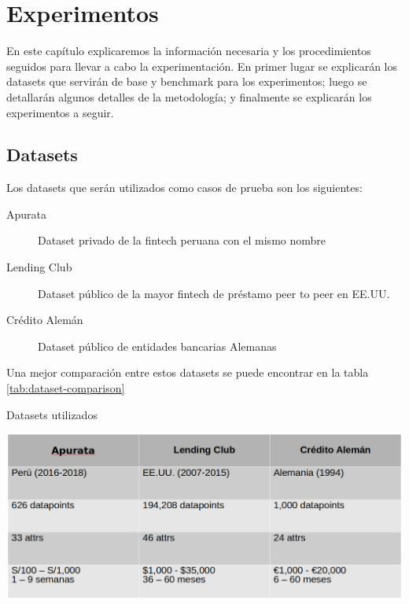 \chapter{Experimentos}


En este capítulo explicaremos la información necesaria y los procedimientos seguidos para llevar a cabo la experimentación. En primer lugar se explicarán los datasets que servirán de base y benchmark para los experimentos; luego se detallarán algunos detalles de la metodología; y finalmente se explicarán los experimentos a seguir.

\section{Datasets}

Los datasets que serán utilizados como casos de prueba son los siguientes:

\begin{description}
    \item[Apurata] Dataset privado de la fintech peruana con el mismo nombre
    \item[Lending Club] Dataset público de la mayor fintech de préstamo peer to peer en EE.UU.
    \item[Crédito Alemán] Dataset público de entidades bancarias Alemanas
\end{description}

Una mejor comparación entre estos datasets se puede encontrar en la tabla \ref{tab:dataset-comparison}

\begin{table}
    \centering
    \caption{Datasets utilizados}
    \label{tab:dataset-comparison}
    \includegraphics[width=0.8\linewidth]{graficos/dataset_comparison.png}
\end{table}

